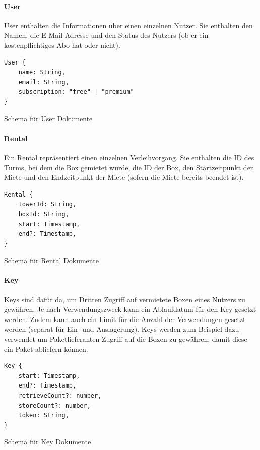 \paragraph{User}
User enthalten die Informationen über einen einzelnen Nutzer. Sie enthalten den Namen, die E-Mail-Adresse und den Status des Nutzers (ob er ein kostenpflichtiges Abo hat oder nicht).

\begin{listing}[H]
    \begin{verbatim}
User {
    name: String,
    email: String,
    subscription: "free" | "premium"
}
\end{verbatim}
    \caption{Schema für User Dokumente}
    \label{lst:datenbankstruktur_user}
\end{listing}


\paragraph{Rental}
Ein Rental repräsentiert einen einzelnen Verleihvorgang. Sie enthalten die ID des Turms, bei dem die Box gemietet wurde, die ID der Box, den Startzeitpunkt der Miete und den Endzeitpunkt der Miete (sofern die Miete bereits beendet ist).

\begin{listing}[H]
    \begin{verbatim}
Rental {
    towerId: String,
    boxId: String,
    start: Timestamp,
    end?: Timestamp,
}
\end{verbatim}
    \caption{Schema für Rental Dokumente}
    \label{lst:datenbankstruktur_rental}
\end{listing}


\paragraph{Key}
Keys sind dafür da, um Dritten Zugriff auf vermietete Boxen eines Nutzers zu gewähren. Je nach Verwendungszweck kann ein Ablaufdatum für den Key gesetzt werden. Zudem kann auch ein Limit für die Anzahl der Verwendungen gesetzt werden (separat für Ein- und Auslagerung). Keys werden zum Beispiel dazu verwendet um Paketlieferanten Zugriff auf die Boxen zu gewähren, damit diese ein Paket abliefern können.

\begin{listing}[H]
    \begin{verbatim}
Key {
    start: Timestamp,
    end?: Timestamp,
    retrieveCount?: number,
    storeCount?: number,
    token: String,
}
\end{verbatim}
    \caption{Schema für Key Dokumente}
    \label{lst:datenbankstruktur_key}
\end{listing}